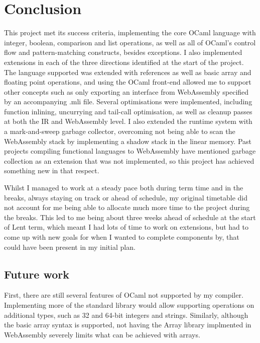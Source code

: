 \chapter{Conclusion}

This project met its success criteria, implementing the core OCaml language with integer, boolean, comparison and list operations, as well as all of OCaml's control flow and pattern-matching constructs, besides exceptions.
I also implemented extensions in each of the three directions identified at the start of the project. The language supported was extended with references as well as basic array and floating point operations, and using the OCaml front-end allowed me to support other concepts such as only exporting an interface from WebAssembly specified by an accompanying .mli file.
Several optimisations were implemented, including function inlining, uncurrying and tail-call optimisation, as well as cleanup passes at both the IR and WebAssembly level.
I also extended the runtime system with a mark-and-sweep garbage collector, overcoming not being able to scan the WebAssembly stack by implementing a shadow stack in the linear memory. 
Past projects compiling functional languages to WebAssembly have mentioned garbage collection as an extension that was not implemented, so this project has achieved something new in that respect.



Whilst I managed to work at a steady pace both during term time and in the breaks, always staying on track or ahead of schedule, my original timetable did not account for me being able to allocate much more time to the project during the breaks.
This led to me being about three weeks ahead of schedule at the start of Lent term, which meant I had lots of time to work on extensions, but had to come up with new goals for when I wanted to complete components by, that could have been present in my initial plan.


\section{Future work}
First, there are still several features of OCaml not supported by my compiler. Implementing more of the standard library would allow supporting operations on additional types, such as 32 and 64-bit integers and strings.
Similarly, although the basic array syntax is supported, not having the Array library implmented in WebAssembly severely limits what can be achieved with arrays.

